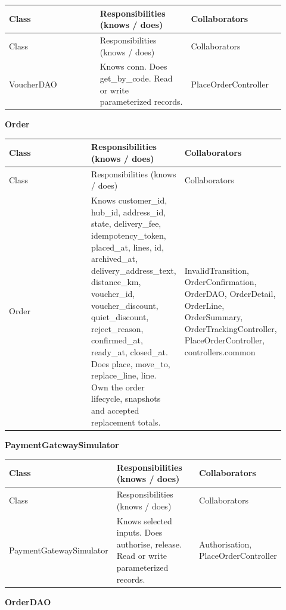 \begin{longtable}{>{\raggedright\arraybackslash}p{0.3067\linewidth}>{\raggedright\arraybackslash}p{0.3067\linewidth}>{\raggedright\arraybackslash}p{0.3067\linewidth}}
Class & Responsibilities (knows / does) & Collaborators \\
\hline\endfirsthead
Class & Responsibilities (knows / does) & Collaborators \\
\hline\endhead
VoucherDAO & Knows conn. Does get\_by\_code. Read or write parameterized records. & PlaceOrderController \\
\end{longtable}
\textbf{Order}

\begin{longtable}{>{\raggedright\arraybackslash}p{0.3067\linewidth}>{\raggedright\arraybackslash}p{0.3067\linewidth}>{\raggedright\arraybackslash}p{0.3067\linewidth}}
Class & Responsibilities (knows / does) & Collaborators \\
\hline\endfirsthead
Class & Responsibilities (knows / does) & Collaborators \\
\hline\endhead
Order & Knows customer\_id, hub\_id, address\_id, state, delivery\_fee, idempotency\_token, placed\_at, lines, id, archived\_at, delivery\_address\_text, distance\_km, voucher\_id, voucher\_discount, quiet\_discount, reject\_reason, confirmed\_at, ready\_at, closed\_at. Does place, move\_to, replace\_line, line. Own the order lifecycle, snapshots and accepted replacement totals. & InvalidTransition, OrderConfirmation, OrderDAO, OrderDetail, OrderLine, OrderSummary, OrderTrackingController, PlaceOrderController, controllers.common \\
\end{longtable}
\textbf{PaymentGatewaySimulator}

\begin{longtable}{>{\raggedright\arraybackslash}p{0.3067\linewidth}>{\raggedright\arraybackslash}p{0.3067\linewidth}>{\raggedright\arraybackslash}p{0.3067\linewidth}}
Class & Responsibilities (knows / does) & Collaborators \\
\hline\endfirsthead
Class & Responsibilities (knows / does) & Collaborators \\
\hline\endhead
PaymentGatewaySimulator & Knows selected inputs. Does authorise, release. Read or write parameterized records. & Authorisation, PlaceOrderController \\
\end{longtable}
\textbf{OrderDAO}

